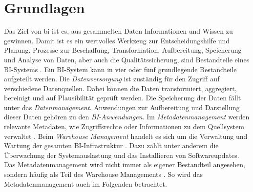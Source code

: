 \chapter{Grundlagen} \label{ch:background}
Das Ziel von \ac{bi} ist es, aus gesammelten Daten Informationen und Wissen zu gewinnen. Damit ist es ein wertvolles Werkzeug zur Entscheidungshilfe und Planung. Prozesse zur Beschaffung, Transformation, Aufbereitung, Speicherung und Analyse von Daten, aber auch die Qualitätssicherung, sind Bestandteile eines BI-Systems \cite{muller_business_2013}. Ein BI-System kann in vier oder fünf grundlegende Bestandteile aufgeteilt werden. Die \textit{Datenversorgung} ist zuständig für den Zugriff auf verschiedene Datenquellen. Dabei können die Daten transformiert, aggregiert, bereinigt und auf Plausibilität geprüft werden. Die Speicherung der Daten fällt unter das \textit{Datenmanagement}. Anwendungen zur Aufbereitung und Darstellung dieser Daten gehören zu den \textit{BI-Anwendungen}. Im \textit{Metadatenmanagement} werden relevante Metadaten, wie Zugriffsrechte oder Informationen zu dem Quellsystem verwaltet \cite{kemper_bi-glossar_2008}. Beim \textit{Warehouse Management} handelt es sich um die Verwaltung und Wartung der gesamten BI-Infrastruktur \cite{grunwald_business_2009}. Dazu zählt unter anderem die Überwachung der Systemauslastung und das Installieren von Softwareupdates. Das {Metadatenmanagement} wird nicht immer als eigener Bestandteil angesehen, sondern häufig als Teil des {Warehouse Managements} \cite{humm_architektur_2005}. So wird das {Metadatenmanagement} auch im Folgenden betrachtet.





